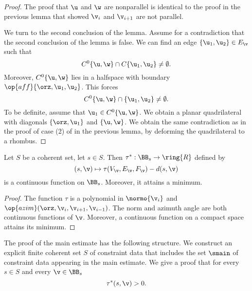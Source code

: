 \begin{proof} 
The proof that $\u$ and $\w$ are nonparallel is identical to the
proof in the previous lemma that showed $\v_i$ and $\v_{i+1}$ are not parallel.

We turn to the second conclusion of the lemma.
Assume for a contradiction that the second conclusion of the lemma is false.
We can find an edge $\{\u_1,\u_2\}\in E_\v$ such that 
\[
C^0\{\u,\w\}\cap C\{\u_1,\u_2\}\ne \emptyset.
\]
Moreover, $C^0\{\u,\w\}$ lies in a halfspace with boundary
$\op{aff}\{\orz,\u_1,\u_2\}$.  This forces 
\[
C^0\{\u,\w\}\cap \{\u_1,\u_2\}\ne \emptyset.
\]
To be definite, assume that $\u_1\in C^0\{\u,\w\}$.  
We obtain a planar quadrilateral with diagonals
$\{\orz,\u_1\}$ and $\{\u,\w\}$.  We obtain the same contradiction
as in the proof of case (2) of  in the previous lemma,
by deforming the quadrilateral to a rhombus.
\end{proof}

\begin{lemma}[continuity]\label{lemma:compact-fan}
Let $S$ be a coherent set, let $s\in S$.  Then $\tau^*:\BB_s\to\ring{R}$ defined
by
\[ 
(s,\v) \mapsto \tau(V_\v,E_\v,F_\v)-d(s,\v)
\] 
is a continuous function on $\BB_s$.  Moreover, it attains a minimum.
\end{lemma}

\begin{proof} 
The function $\tau$ is a polynomial in $\normo{\v_i}$ and
$\op{azim}(\orz,\v_i,\v_{i+1},\v_{i-1})$.  The norm and azimuth
angle are both continuous functions of $\v$.
Moreover, a continuous function on a compact space attains its minimum.
\end{proof}



The proof of the main estimate has the following structure.  We
construct an explicit finite coherent set $S$ of constraint data that
includes the set $\smain$ of constraint data appearing in the main
estimate.  We give a proof that for every $s\in S$ and every $\v\in
\BB_s$
\begin{equation}\label{eqn:main:sv}
\tau^*(s,\v)> 0.
\end{equation}


